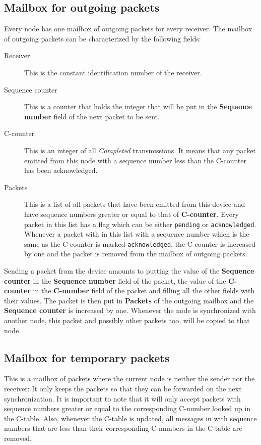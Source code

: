 \documentclass{article}
\begin{document}
\subsection{Mailbox for outgoing packets}
Every node has one mailbox of outgoing packets for every receiver. The mailbox of outgoing packets can be characterized by the following fields:
\begin{description}
  \item[Receiver] This is the constant identification number of the receiver.
  \item[Sequence counter] This is a counter that holds the integer that will be put in the \textbf{Sequence number} field of the next packet to be sent.
  \item[C-counter] This is an integer of all \emph{Completed} transmissions. It means that any packet emitted from this node with a sequence number less than the C-counter has been acknowledged.
  \item[Packets] This is a list of all packets that have been emitted from this device and have sequence numbers greater or equal to that of \textbf{C-counter}. Every packet in this list has a flag which can be either \texttt{pending} or \texttt{acknowledged}. Whenever a packet with in this list with a sequence number which is the same as the C-counter is marked \texttt{acknowledged}, the C-counter is increased by one and the packet is removed from the mailbox of outgoing packets.
\end{description}

Sending a packet from the device amounts to putting the value of the \textbf{Sequence counter} in the \textbf{Sequence number} field of the packet, the value of the \textbf{C-counter} in the \textbf{C-number} field of the packet and filling all the other fields with their values. The packet is then put in \textbf{Packets} of the outgoing mailbox and the \textbf{Sequence counter} is increased by one. Whenever the node is synchronized with another node, this packet and possibly other packets too, will be copied to that node.

\subsection{Mailbox for temporary packets}
This is a mailbox of packets where the current node is neither the sender nor the receiver: It only keeps the packets so that they can be forwarded on the next synchronization. It is important to note that it will only accept packets with sequence numbers greater or equal to the corresponding C-number looked up in the C-table. Also, whenever the C-table is updated, all messages in with sequence numbers that are less than their corresponding C-numbers in the C-table are removed.
\end{document}

